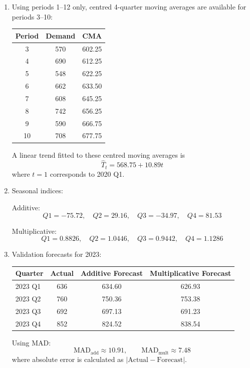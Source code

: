 \documentclass[11pt,a4paper]{article}
\begin{document}
\begin{enumerate}
\item Using periods 1--12 only, centred 4-quarter moving averages are available for periods 3--10:

\begin{center}
\begin{tabular}{ccc}
\toprule
Period & Demand & CMA \\
\midrule
3 & 570 & 602.25 \\
4 & 690 & 612.25 \\
5 & 548 & 622.25 \\
6 & 662 & 633.50 \\
7 & 608 & 645.25 \\
8 & 742 & 656.25 \\
9 & 590 & 666.75 \\
10 & 708 & 677.75 \\
\bottomrule
\end{tabular}
\end{center}

A linear trend fitted to these centred moving averages is
\[
\hat{T}_t = 568.75 + 10.89t
\]
where $t=1$ corresponds to 2020 Q1.

\item Seasonal indices:

Additive:
\[
Q1=-75.72,\quad Q2=29.16,\quad Q3=-34.97,\quad Q4=81.53
\]

Multiplicative:
\[
Q1=0.8826,\quad Q2=1.0446,\quad Q3=0.9442,\quad Q4=1.1286
\]

\item Validation forecasts for 2023:

\begin{center}
\begin{tabular}{lccc}
\toprule
Quarter & Actual & Additive Forecast & Multiplicative Forecast \\
\midrule
2023 Q1 & 636 & 634.60 & 626.93 \\
2023 Q2 & 760 & 750.36 & 753.38 \\
2023 Q3 & 692 & 697.13 & 691.23 \\
2023 Q4 & 852 & 824.52 & 838.54 \\
\bottomrule
\end{tabular}
\end{center}

Using MAD:
\[
\text{MAD}_{\text{add}} \approx 10.91,\qquad \text{MAD}_{\text{mult}} \approx 7.48
\]
where absolute error is calculated as $|\text{Actual} - \text{Forecast}|$.


\end{enumerate}
\end{document}
